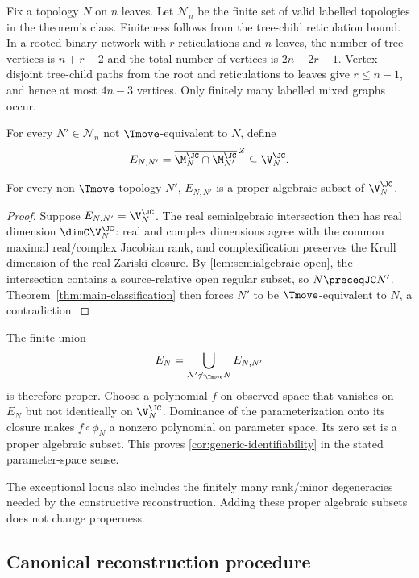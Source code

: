 Fix a topology $N$ on $n$ leaves.  Let $\mathcal N_n$ be the finite set of valid labelled topologies in the theorem's class.  Finiteness follows from the tree-child reticulation bound.  In a rooted binary network with $r$ reticulations and $n$ leaves, the number of tree vertices is $n+r-2$ and the total number of vertices is $2n+2r-1$.  Vertex-disjoint tree-child paths from the root and reticulations to leaves give $r\le n-1$, and hence at most $4n-3$ vertices.  Only finitely many labelled mixed graphs occur.

For every $N'\in\mathcal N_n$ not $\Tmove$-equivalent to $N$, define
\[
E_{N,N'}=
\overline{\M_N^{\JC}\cap\M_{N'}^{\JC}}^{\,Z}
\subseteq\V_N^{\JC}.
\]

\begin{proposition}\label{prop:proper-intersections}
For every non-$\Tmove$ topology $N'$, $E_{N,N'}$ is a proper algebraic subset of $\V_N^{\JC}$.
\end{proposition}

\begin{proof}
Suppose $E_{N,N'}=\V_N^{\JC}$.  The real semialgebraic intersection then has real dimension $\dimC\V_N^{\JC}$: real and complex dimensions agree with the common maximal real/complex Jacobian rank, and complexification preserves the Krull dimension of the real Zariski closure.  By \cref{lem:semialgebraic-open}, the intersection contains a source-relative open regular subset, so $N\preceqJC N'$.  Theorem~\ref{thm:main-classification} then forces $N'$ to be $\Tmove$-equivalent to $N$, a contradiction.
\end{proof}

The finite union
\[
E_N=\bigcup_{N'\not\sim_{\Tmove}N}E_{N,N'}
\]
is therefore proper.  Choose a polynomial $f$ on observed space that vanishes on $E_N$ but not identically on $\V_N^{\JC}$.  Dominance of the parameterization onto its closure makes $f\circ\phi_N$ a nonzero polynomial on parameter space.  Its zero set is a proper algebraic subset.  This proves \cref{cor:generic-identifiability} in the stated parameter-space sense.

The exceptional locus also includes the finitely many rank/minor degeneracies needed by the constructive reconstruction.  Adding these proper algebraic subsets does not change properness.

\subsection{Canonical reconstruction procedure}

